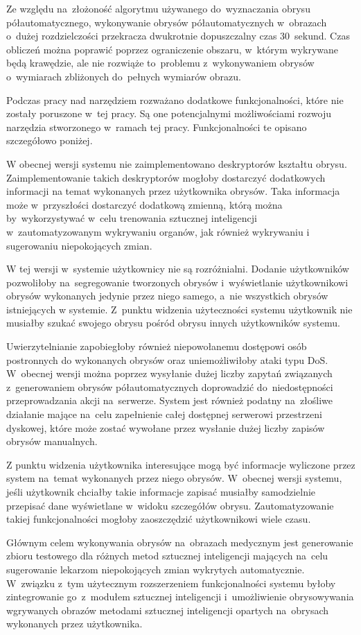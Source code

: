\documentclass[a4paper,11pt,twoside,openright]{report}
\theoremstyle{definition}
\begin{document}
Ze względu na~złożoność algorytmu używanego do~wyznaczania obrysu półautomatycznego,
wykonywanie obrysów półautomatycznych w~obrazach o~dużej rozdzielczości przekracza
dwukrotnie dopuszczalny czas 30~sekund. Czas
obliczeń można poprawić poprzez ograniczenie obszaru, w~którym wykrywane będą
krawędzie, ale nie rozwiąże to~problemu z~wykonywaniem obrysów o~wymiarach
zbliżonych do~pełnych wymiarów obrazu.

Podczas pracy nad narzędziem rozważano dodatkowe funkcjonalności, które nie zostały
poruszone w~tej pracy. Są one potencjalnymi możliwościami rozwoju narzędzia
stworzonego w~ramach tej pracy. Funkcjonalności te opisano szczegółowo poniżej.

W obecnej wersji systemu nie zaimplementowano deskryptorów kształtu obrysu.
Zaimplementowanie takich deskryptorów mogłoby dostarczyć dodatkowych informacji
na temat wykonanych przez użytkownika obrysów. Taka informacja może w~przyszłości
dostarczyć dodatkową zmienną, którą można by~wykorzystywać w~celu trenowania
sztucznej inteligencji w~zautomatyzowanym wykrywaniu organów, jak również wykrywaniu
i sugerowaniu niepokojących zmian.

W tej wersji w~systemie użytkownicy nie są rozróżnialni. Dodanie użytkowników
pozwoliłoby na~segregowanie tworzonych obrysów i~wyświetlanie użytkownikowi
obrysów wykonanych jedynie przez niego samego, a~nie wszystkich obrysów istniejących
w systemie. Z~punktu widzenia użyteczności systemu użytkownik nie musiałby szukać
swojego obrysu pośród obrysu innych użytkowników systemu.

Uwierzytelnianie zapobiegłoby również niepowołanemu dostępowi osób postronnych
do wykonanych obrysów oraz uniemożliwiłoby ataki typu DoS. W~obecnej wersji można
poprzez wysyłanie dużej liczby zapytań związanych z~generowaniem obrysów półautomatycznych
doprowadzić do~niedostępności przeprowadzania akcji na~serwerze. System jest również
podatny na~złośliwe działanie mające na~celu zapełnienie całej dostępnej serwerowi
przestrzeni dyskowej, które może zostać wywołane przez wysłanie dużej liczby
zapisów obrysów manualnych.

Z punktu widzenia użytkownika interesujące mogą być informacje wyliczone przez
system na~temat wykonanych przez niego obrysów. W~obecnej wersji systemu, jeśli
użytkownik chciałby takie informacje zapisać musiałby samodzielnie przepisać dane
wyświetlane w~widoku szczegółów obrysu. Zautomatyzowanie takiej funkcjonalności
mogłoby zaoszczędzić użytkownikowi wiele czasu.

Głównym celem wykonywania obrysów na~obrazach medycznym jest generowanie zbioru
testowego dla różnych metod sztucznej inteligencji mających na~celu sugerowanie
lekarzom niepokojących zmian wykrytych automatycznie. W~związku z~tym użytecznym
rozszerzeniem funkcjonalności systemu byłoby zintegrowanie go~z~modułem sztucznej
inteligencji i~umożliwienie obrysowywania wgrywanych obrazów metodami sztucznej
inteligencji opartych na~obrysach wykonanych przez użytkownika.
\end{document}
